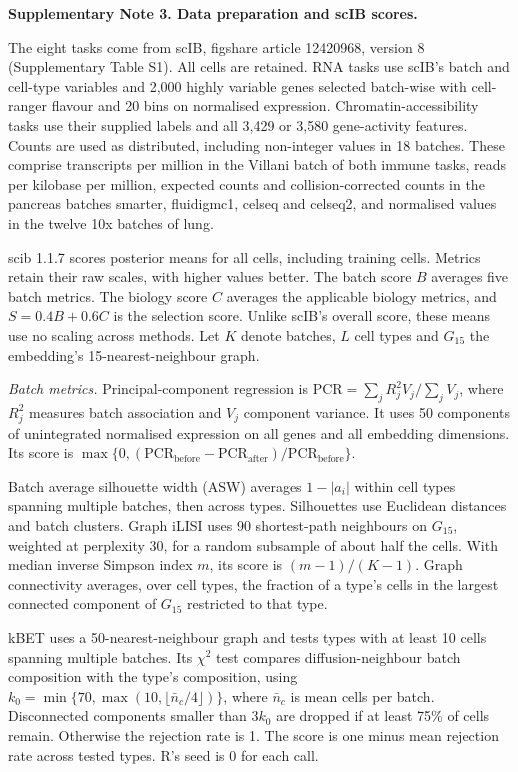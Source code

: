 \medskip\noindent\textbf{Supplementary Note 3. Data preparation and scIB scores.}\par\smallskip
\begingroup\small\setlength{\parskip}{3pt}
The eight tasks come from scIB, figshare article 12420968, version 8 (Supplementary Table S1). All cells are retained. RNA tasks use scIB's batch and cell-type variables and 2,000 highly variable genes selected batch-wise with cell-ranger flavour and 20 bins on normalised expression. Chromatin-accessibility tasks use their supplied labels and all 3,429 or 3,580 gene-activity features. Counts are used as distributed, including non-integer values in 18 batches. These comprise transcripts per million in the Villani batch of both immune tasks, reads per kilobase per million, expected counts and collision-corrected counts in the pancreas batches smarter, fluidigmc1, celseq and celseq2, and normalised values in the twelve 10x batches of lung.

scib 1.1.7 scores posterior means for all cells, including training cells. Metrics retain their raw scales, with higher values better. The batch score $B$ averages five batch metrics. The biology score $C$ averages the applicable biology metrics, and $S=0.4B+0.6C$ is the selection score. Unlike scIB's overall score, these means use no scaling across methods. Let $K$ denote batches, $L$ cell types and $G_{15}$ the embedding's 15-nearest-neighbour graph.

\noindent\textit{Batch metrics.} Principal-component regression is $\mathrm{PCR}=\sum_j R_j^2V_j/\sum_jV_j$, where $R_j^2$ measures batch association and $V_j$ component variance. It uses 50 components of unintegrated normalised expression on all genes and all embedding dimensions. Its score is $\max\{0,(\mathrm{PCR}_{\mathrm{before}}-\mathrm{PCR}_{\mathrm{after}})/\mathrm{PCR}_{\mathrm{before}}\}$.

Batch average silhouette width (ASW) averages $1-|a_i|$ within cell types spanning multiple batches, then across types. Silhouettes use Euclidean distances and batch clusters. Graph iLISI uses 90 shortest-path neighbours on $G_{15}$, weighted at perplexity 30, for a random subsample of about half the cells. With median inverse Simpson index $m$, its score is $(m-1)/(K-1)$. Graph connectivity averages, over cell types, the fraction of a type's cells in the largest connected component of $G_{15}$ restricted to that type.

kBET uses a 50-nearest-neighbour graph and tests types with at least 10 cells spanning multiple batches. Its $\chi^2$ test compares diffusion-neighbour batch composition with the type's composition, using $k_0=\min\{70,\max(10,\lfloor\bar n_c/4\rfloor)\}$, where $\bar n_c$ is mean cells per batch. Disconnected components smaller than $3k_0$ are dropped if at least 75\% of cells remain. Otherwise the rejection rate is 1. The score is one minus mean rejection rate across tested types. R's seed is 0 for each call.

